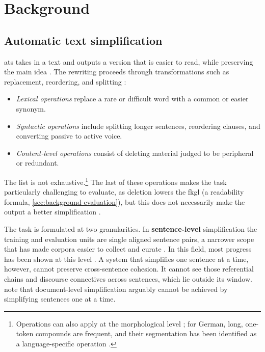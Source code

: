\chapter{Background}
\label{sec:background}

\section{Automatic text simplification}
\label{sec:background-ats}

\Gls{ats} takes in a text and outputs a version that is easier to read, while preserving the main idea \parencite[259]{siddharthan-2014-survey}.
The rewriting proceeds through transformations such as replacement, reordering, and splitting \parencite[135, 137--138]{alva-manchego-etal-2020-survey}:

\begin{itemize}
	\item \emph{Lexical operations} replace a rare or difficult word with a common or easier synonym.
	\item \emph{Syntactic operations} include splitting longer sentences, reordering clauses, and converting passive to active voice.
	\item \emph{Content-level operations} consist of deleting material judged to be peripheral or redundant.
\end{itemize}

The list is not exhaustive.\footnote{Operations can also apply at the morphological level \parencite[117]{cardon-bibal-2023-operations}; for German, long, one-token compounds are frequent, and their segmentation has been identified as a language-specific operation \parencite[189]{stodden2026automatic}.}
The last of these operations makes the task particularly challenging to evaluate, as deletion lowers the \gls{fkgl} (a readability formula, \cref{sec:background-evaluation}), but this does not necessarily make the output a better simplification \parencite[175, 177]{alva-manchego-etal-2020-survey}.

The task is formulated at two granularities.
In \textbf{sentence-level} simplification the training and evaluation units are single aligned sentence pairs, a narrower scope that has made corpora easier to collect and curate \parencite[136]{alva-manchego-etal-2020-survey}.
In this field, most progress has been shown at this level \parencite[1]{vasquezrodriguez2024simple}.
A system that simplifies one sentence at a time, however, cannot preserve cross-sentence cohesion.
It cannot see those referential chains and discourse connectives across sentences, which lie outside its window.
\textcite[136]{alva-manchego-etal-2020-survey} note that document-level simplification arguably cannot be achieved by simplifying sentences one at a time.

